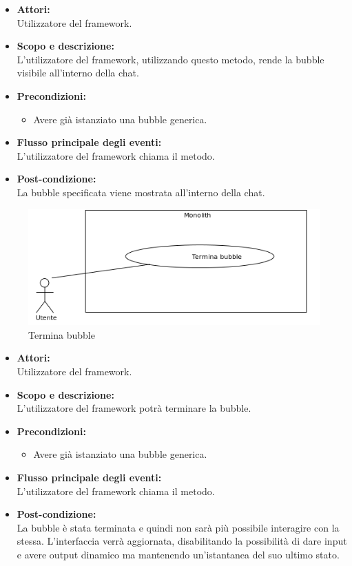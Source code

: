 \begin{itemize}
	\item \textbf{Attori:}
	\\Utilizzatore del framework.
	\item \textbf{Scopo e descrizione:} 
	\\L'utilizzatore del framework, utilizzando questo metodo, rende la bubble visibile all'interno della chat.
	\item \textbf{Precondizioni:}
	\begin{itemize}
		\item Avere già istanziato una bubble generica.
	\end{itemize}
	\item \textbf{Flusso principale degli eventi:}
	\\L'utilizzatore del framework chiama il metodo.
	\item \textbf{Post-condizione:}
	\\La bubble specificata viene mostrata all'interno della chat.
\end{itemize}


\begin{figure}[H]
	\centering
	\includegraphics[width=15cm]{../../documenti/AnalisiDeiRequisiti/Diagrammi_img/uc1_19.png}
	\caption{\UCCaption{} Termina bubble}
\end{figure}

\begin{itemize}
	\item \textbf{Attori:}
	\\Utilizzatore del framework.
	\item \textbf{Scopo e descrizione:} 
	\\L'utilizzatore del framework potrà terminare la bubble.
	\item \textbf{Precondizioni:}
	\begin{itemize}
		\item Avere già istanziato una bubble generica.
	\end{itemize}
	\item \textbf{Flusso principale degli eventi:}
	\\L'utilizzatore del framework chiama il metodo.
	\item \textbf{Post-condizione:}
	\\La bubble è stata terminata e quindi non sarà più possibile interagire con la stessa. L'interfaccia verrà aggiornata, disabilitando la possibilità di dare input e avere output dinamico ma mantenendo un'istantanea del suo ultimo stato.
\end{itemize}

